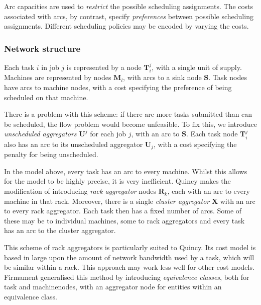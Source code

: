 Arc capacities are used to \emph{restrict} the possible scheduling assignments. The costs associated with arcs, by contrast, specify \emph{preferences} between possible scheduling assignments. Different scheduling policies may be encoded by varying the costs.

\subsubsection{Network structure}

Each task $i$ in job $j$ is represented by a node $\mathbf{T}_i^j$, with a single unit of supply. Machines are represented by nodes $\mathbf{M}_l$, with arcs to a sink node $\mathbf{S}$. Task nodes have arcs to machine nodes, with a cost specifying the preference of being scheduled on that machine.

There is a problem with this scheme: if there are more tasks submitted than can be scheduled, the flow problem would become unfeasible. To fix this, we introduce \emph{unscheduled aggregators} $\mathbf{U}^j$ for each job $j$, with an arc to $\mathbf{S}$. Each task node $\mathbf{T}_i^j$ also has an arc to its unscheduled aggregator $\mathbf{U}_j$, with a cost specifying the penalty for being unscheduled.

In the model above, every task has an arc to every machine. Whilst this allows for the model to be highly precise, it is very inefficient\footnotemark. Quincy makes the modification of introducing \emph{rack aggregator} nodes $\mathbf{R}_k$, each with an arc to every machine in that rack. Moreover, there is a single \emph{cluster aggregator} $\mathbf{X}$ with an arc to every rack aggregator\footnotemark. Each task then has a fixed number of arcs. Some of these may be to individual machines, some to rack aggregators and every task has an arc to the cluster aggregator. 

This scheme of rack aggregators is particularly suited to Quincy. Its cost model is based in large upon the amount of network bandwidth used by a task, which will be similar within a rack. This approach may work less well for other cost models. Firmament generalised this method by introducing \emph{equivalence classes}, both for task and machine\footnotemark nodes, with an aggregator node for entities within an equivalence class.

